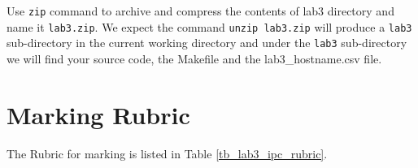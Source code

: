 \begin{enumerate}
\end{enumerate}
Use \verb+zip+ command to archive and compress the contents of lab3 directory and name it \verb+lab3.zip+. We expect the command \verb+unzip lab3.zip+ will produce a \verb+lab3+ sub-directory in the current working directory and under the \verb+lab3+ sub-directory we will find your source code, the Makefile and the lab3\_hostname.csv file.

\section{Marking Rubric}
The Rubric for marking is listed in Table \ref{tb_lab3_ipc_rubric}.

